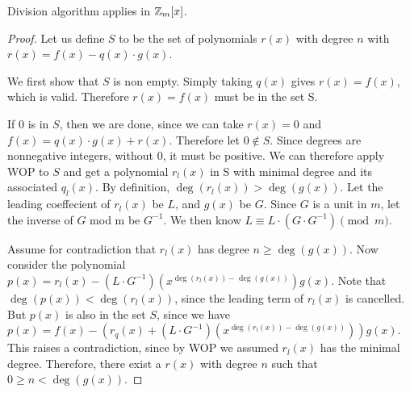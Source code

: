 \begin{theorem**}

    Division algorithm applies in $\mathbb{Z}_m[x]$.

\end{theorem**}

    \begin{proof}
    Let us define $S$ to be the set of polynomials $r(x)$ with degree $n$ with $r(x) = f(x) - q(x) \cdot g(x)$.

    We first show that $S$ is non empty. Simply taking $q(x)$ gives $r(x) = f(x)$, which is valid. Therefore $r(x)=f(x)$ must be in the set S.

    If $0$ is in $S$, then we are done, since we can take $r(x)=0$ and $f(x) = q(x) \cdot g(x)+r(x)$. Therefore let $0 \notin S$. Since degrees are nonnegative integers, without $0$, it must be positive. We can therefore apply WOP to $S$ and get a polynomial $r_l(x)$ in S with minimal degree and its associated $q_l(x)$. By definition, $\deg(r_l(x)) >  \deg(g(x))$. Let the leading coeffecient of $r_l(x)$ be $L$, and $g(x)$ be $G$. Since $G$ is a unit in $m$, let the inverse of $G$ mod m be $G^{-1}$. We then know $L \equiv L \cdot (G \cdot G^{-1}) \pmod m$.

    Assume for contradiction that $r_l(x)$ has degree $n \geq \deg(g(x))$. Now consider the polynomial $p(x) = r_l(x)-(L \cdot G^{-1})(x^{\deg(r_l(x))-\deg(g(x))})g(x)$. Note that $\deg(p(x)) < \deg(r_l(x))$, since the leading term of $r_l(x)$ is cancelled. But $p(x)$ is also in the set $S$, since we have $p(x) = f(x) - (r_q(x) +(L \cdot G^{-1})(x^{\deg(r_l(x))-\deg(g(x))}) )g(x)$. This raises a contradiction, since by WOP we assumed $r_l(x)$ has the minimal degree. Therefore, there exist a $r(x)$ with degree $n$ such that $0 \geq n < \deg(g(x))$.
\end{proof}